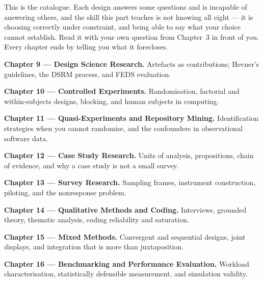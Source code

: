 
This is the catalogue. Each design answers some questions and is
incapable of answering others, and the skill this part teaches is not knowing
all eight --- it is choosing correctly under constraint, and being able to say
what your choice cannot establish. Read it with your own question from
Chapter~3 in front of you. Every chapter ends by telling you what it forecloses.

\begin{conceptbox}
\begin{tight}
  \item \textbf{Chapter 9 --- Design Science Research.} Artefacts as contributions; Hevner's guidelines, the DSRM process, and FEDS evaluation.
  \item \textbf{Chapter 10 --- Controlled Experiments.} Randomisation, factorial and within-subjects designs, blocking, and human subjects in computing.
  \item \textbf{Chapter 11 --- Quasi-Experiments and Repository Mining.} Identification strategies when you cannot randomise, and the confounders in observational software data.
  \item \textbf{Chapter 12 --- Case Study Research.} Units of analysis, propositions, chain of evidence, and why a case study is not a small survey.
  \item \textbf{Chapter 13 --- Survey Research.} Sampling frames, instrument construction, piloting, and the nonresponse problem.
  \item \textbf{Chapter 14 --- Qualitative Methods and Coding.} Interviews, grounded theory, thematic analysis, coding reliability and saturation.
  \item \textbf{Chapter 15 --- Mixed Methods.} Convergent and sequential designs, joint displays, and integration that is more than juxtaposition.
  \item \textbf{Chapter 16 --- Benchmarking and Performance Evaluation.} Workload characterisation, statistically defensible measurement, and simulation validity.
\end{tight}
\end{conceptbox}
